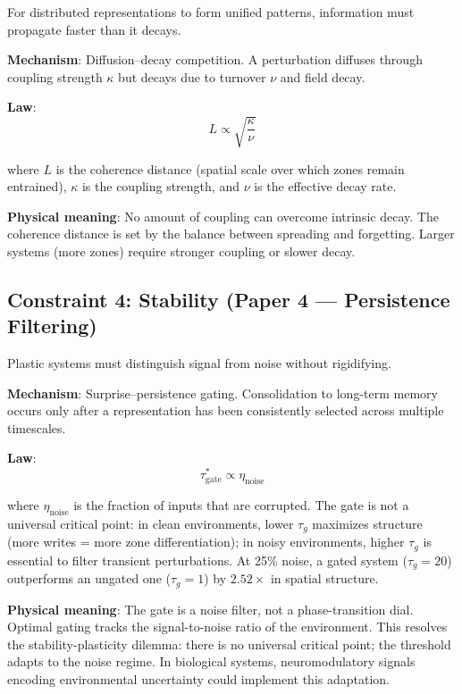 \documentclass[11pt]{article}
\begin{document}
For distributed representations to form unified patterns, information must propagate faster than it decays.

\textbf{Mechanism}: Diffusion--decay competition. A perturbation diffuses through coupling strength $\kappa$ but decays due to turnover $\nu$ and field decay.

\textbf{Law}:
\begin{equation}
L \propto \sqrt{\frac{\kappa}{\nu}}
\end{equation}

where $L$ is the coherence distance (spatial scale over which zones remain entrained), $\kappa$ is the coupling strength, and $\nu$ is the effective decay rate.

\textbf{Physical meaning}: No amount of coupling can overcome intrinsic decay. The coherence distance is set by the balance between spreading and forgetting. Larger systems (more zones) require stronger coupling or slower decay.

\subsection{Constraint 4: Stability (Paper 4 — Persistence Filtering)}

Plastic systems must distinguish signal from noise without rigidifying.

\textbf{Mechanism}: Surprise--persistence gating. Consolidation to long-term memory occurs only after a representation has been consistently selected across multiple timescales.

\textbf{Law}:
\begin{equation}
\tau_{\text{gate}}^* \propto \eta_{\text{noise}}
\end{equation}

where $\eta_{\text{noise}}$ is the fraction of inputs that are corrupted. The gate is not a universal critical point: in clean environments, lower $\tau_g$ maximizes structure (more writes = more zone differentiation); in noisy environments, higher $\tau_g$ is essential to filter transient perturbations. At 25\% noise, a gated system ($\tau_g = 20$) outperforms an ungated one ($\tau_g = 1$) by $2.52\times$ in spatial structure.

\textbf{Physical meaning}: The gate is a noise filter, not a phase-transition dial. Optimal gating tracks the signal-to-noise ratio of the environment. This resolves the stability-plasticity dilemma: there is no universal critical point; the threshold adapts to the noise regime. In biological systems, neuromodulatory signals encoding environmental uncertainty could implement this adaptation.
\end{document}
